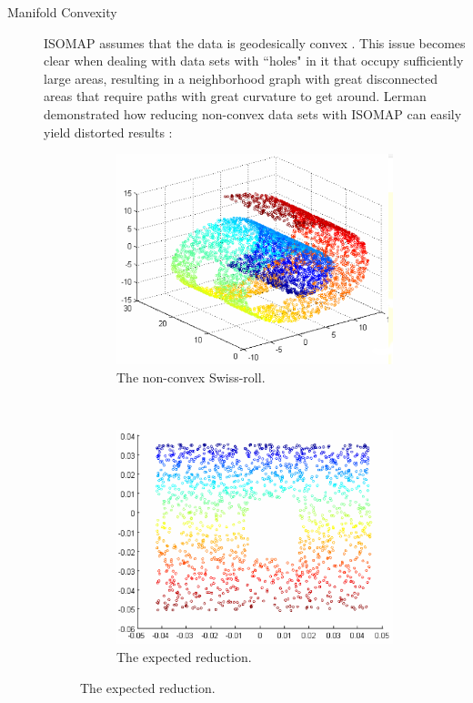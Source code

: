 \begin{description}
	\item[Manifold Convexity] ISOMAP assumes that the data is geodesically convex \cite{donoho2002does}. This issue becomes clear when dealing with data sets with ``holes" in it that occupy sufficiently large areas, resulting in a neighborhood graph with great disconnected areas that require paths with great curvature to get around. Lerman demonstrated how reducing non-convex data sets with ISOMAP can easily yield distorted results \cite{lerman2005}:
	\begin{figure}[H]
		\centering
		\begin{subfigure}[H]{.45\linewidth}
			\includegraphics[width=\linewidth]{img/convexity/original.png}
			\captionsetup{justification=centering}
			\caption{The non-convex Swiss-roll.}
		\end{subfigure}
		~
		\begin{subfigure}[H]{.45\linewidth}
			\includegraphics[width=\linewidth]{img/convexity/expected.png}
			\captionsetup{justification=centering}
			\caption{The expected reduction.}
		\end{subfigure}
		\newline\newline


\end{figure}
\end{description}
